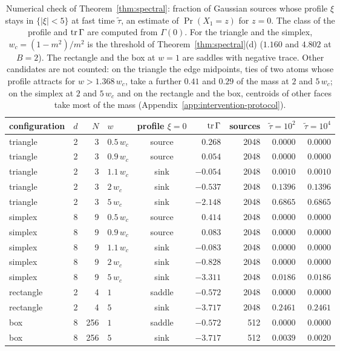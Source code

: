 \documentclass{article} %
\theoremstyle{plain}
\theoremstyle{definition}
\theoremstyle{remark}
\begin{document}
\begin{table}[htb]
\centering\small
\begin{tabular}{@{}lrrlcrrrr@{}}
\toprule
configuration & $d$ & $N$ & $w$ & profile $\xi=0$ & $\operatorname{tr}\Gamma$ & sources & $\tilde\tau=10^2$ & $\tilde\tau=10^4$\\
\midrule
triangle & 2 & 3 & $0.5\,w_c$ & source & $0.268$ & 2048 & $0.0000$ & $0.0000$\\
triangle & 2 & 3 & $0.9\,w_c$ & source & $0.054$ & 2048 & $0.0000$ & $0.0000$\\
triangle & 2 & 3 & $1.1\,w_c$ & sink & $-0.054$ & 2048 & $0.0010$ & $0.0010$\\
triangle & 2 & 3 & $2\,w_c$ & sink & $-0.537$ & 2048 & $0.1396$ & $0.1396$\\
triangle & 2 & 3 & $5\,w_c$ & sink & $-2.148$ & 2048 & $0.6865$ & $0.6865$\\
simplex & 8 & 9 & $0.5\,w_c$ & source & $0.414$ & 2048 & $0.0000$ & $0.0000$\\
simplex & 8 & 9 & $0.9\,w_c$ & source & $0.083$ & 2048 & $0.0000$ & $0.0000$\\
simplex & 8 & 9 & $1.1\,w_c$ & sink & $-0.083$ & 2048 & $0.0000$ & $0.0000$\\
simplex & 8 & 9 & $2\,w_c$ & sink & $-0.828$ & 2048 & $0.0000$ & $0.0000$\\
simplex & 8 & 9 & $5\,w_c$ & sink & $-3.311$ & 2048 & $0.0186$ & $0.0186$\\
rectangle & 2 & 4 & $1$ & saddle & $-0.572$ & 2048 & $0.0000$ & $0.0000$\\
rectangle & 2 & 4 & $5$ & sink & $-3.717$ & 2048 & $0.2461$ & $0.2461$\\
box & 8 & 256 & $1$ & saddle & $-0.572$ & 512 & $0.0000$ & $0.0000$\\
box & 8 & 256 & $5$ & sink & $-3.717$ & 512 & $0.0039$ & $0.0020$\\
\bottomrule
\end{tabular}
\caption{Numerical check of Theorem~\ref{thm:spectral}: fraction of Gaussian sources whose
profile $\xi$ stays in $\{|\xi|<5\}$ at fast time $\tilde\tau$, an estimate of $\Pr(X_1=z)$ for $z=0$.
The class of the profile and $\operatorname{tr}\Gamma$ are computed from $\Gamma(0)$. For the triangle and the
simplex, $w_c=(1-m^2)/m^2$ is the threshold of Theorem~\ref{thm:spectral}(d)
($1.160$ and $4.802$ at $B=2$). The rectangle and the box at $w=1$ are saddles with negative
trace. Other candidates are not counted: on the triangle the edge midpoints, ties of two atoms
whose profile attracts for $w>1.368\,w_c$, take a further $0.41$ and $0.29$ of the mass at $2$ and
$5\,w_c$; on the simplex at $2$ and $5\,w_c$ and on the rectangle and the box, centroids of other
faces take most of the mass (Appendix~\ref{app:intervention-protocol}).}
\label{tab:spectral}
\end{table}
\end{document}
